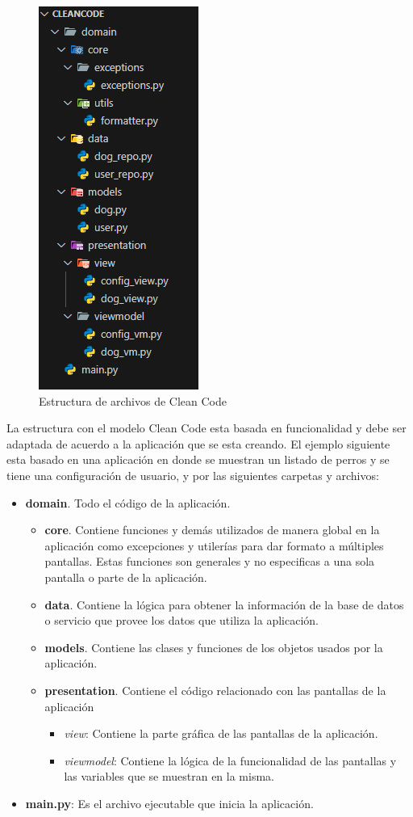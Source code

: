 \documentclass[11pt]{article}
\begin{document}
		\begin{figure}[ht!]
			\centering
			\includegraphics[width=0.3\linewidth]{img/cc.png}
			\caption{Estructura de archivos de Clean Code}
			\label{fig:cc}
		\end{figure}
		\par La estructura con el modelo Clean Code esta basada en funcionalidad y debe ser adaptada de acuerdo a la aplicación que se esta creando. El ejemplo siguiente esta basado en una aplicación en donde se muestran un listado de perros y se tiene una configuración de usuario, y por las siguientes carpetas y archivos:
		\begin{itemize}
			\item \textbf{domain}. Todo el código de la aplicación.
				\begin{itemize}
					\item \textbf{core}. Contiene funciones y demás utilizados de manera global en la aplicación como excepciones y utilerías para dar formato a múltiples pantallas. Estas funciones son generales y no especificas a una sola pantalla o parte de la aplicación.
					\item	\textbf{data}. Contiene la lógica para obtener la información de la base de datos o servicio que provee los datos que utiliza la aplicación.
					\item \textbf{models}. Contiene las clases y funciones de los objetos usados por la aplicación.
					\item \textbf{presentation}. Contiene el código relacionado con las pantallas de la aplicación
						\begin{itemize}
							\item \textit{view}: Contiene la parte gráfica de las pantallas de la aplicación.
							\item \textit{viewmodel}: Contiene la lógica de la funcionalidad de las pantallas y las variables que se muestran en la misma.
						\end{itemize}
				\end{itemize}
			\item \textbf{main.py}: Es el archivo ejecutable que inicia la aplicación.
		\end{itemize}
\end{document}
